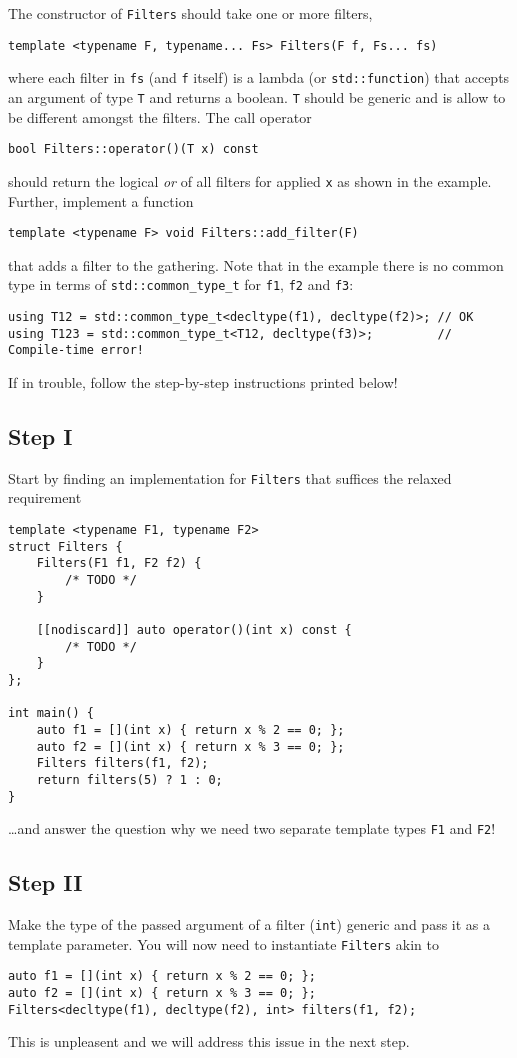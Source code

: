 The constructor of \texttt{Filters} should take one or more filters,
\begin{lstlisting}
template <typename F, typename... Fs> Filters(F f, Fs... fs)
\end{lstlisting}
where each filter in \texttt{fs} (and \texttt{f} itself) is a lambda (or \texttt{std::function}) that accepts an argument of type \texttt{T} and returns a boolean. \texttt{T} should be generic and is allow to be different amongst the filters.
The call operator 
\begin{lstlisting}
bool Filters::operator()(T x) const
\end{lstlisting}
should return the logical \textit{or} of all filters for applied \texttt{x} as shown in the example.
Further, implement a function
\begin{lstlisting}
template <typename F> void Filters::add_filter(F)
\end{lstlisting}
that adds a filter to the gathering. Note that in the example there is no common type in terms of \texttt{std::common\_type\_t} for \texttt{f1}, \texttt{f2} and \texttt{f3}:
\begin{lstlisting}
using T12 = std::common_type_t<decltype(f1), decltype(f2)>; // OK
using T123 = std::common_type_t<T12, decltype(f3)>;         // Compile-time error!
\end{lstlisting}

If in trouble, follow the step-by-step instructions printed below!

\subsection{Step I}
Start by finding an implementation for \texttt{Filters} that suffices the relaxed requirement
\begin{lstlisting}
template <typename F1, typename F2>
struct Filters {
    Filters(F1 f1, F2 f2) {
        /* TODO */
    }

    [[nodiscard]] auto operator()(int x) const {
        /* TODO */
    }
};

int main() {
    auto f1 = [](int x) { return x % 2 == 0; };
    auto f2 = [](int x) { return x % 3 == 0; };
    Filters filters(f1, f2);
    return filters(5) ? 1 : 0;
}
\end{lstlisting}
\ldots and answer the question why we need two separate template types \texttt{F1} and \texttt{F2}!

\subsection{Step II}
Make the type of the passed argument of a filter (\texttt{int}) generic and pass it as a template parameter. You will now need to instantiate \texttt{Filters} akin to
\begin{lstlisting}
auto f1 = [](int x) { return x % 2 == 0; };
auto f2 = [](int x) { return x % 3 == 0; };
Filters<decltype(f1), decltype(f2), int> filters(f1, f2);
\end{lstlisting}
This is unpleasent and we will address this issue in the next step.

